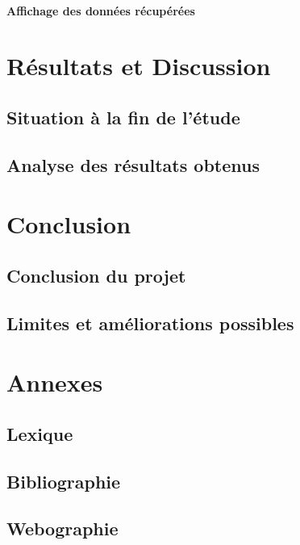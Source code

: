 \documentclass[10pt, a4paper]{report}
\begin{document}
	\subsubsection{Affichage des données récupérées}
	
	\chapter{Résultats et Discussion}
	\section{Situation à la fin de l’étude}
	\section{Analyse des résultats obtenus}
	
	\chapter{Conclusion}
	\section{Conclusion du projet}
	\section{Limites et améliorations possibles}
	
	\appendix
	\chapter{Annexes}
	\section{Lexique}
	\section{Bibliographie}
	\section{Webographie}
	
	
	
		
	
	\nocite{*}
	
	
	
	\clearpage
	
	\printglossaries
	
	
\end{document}
